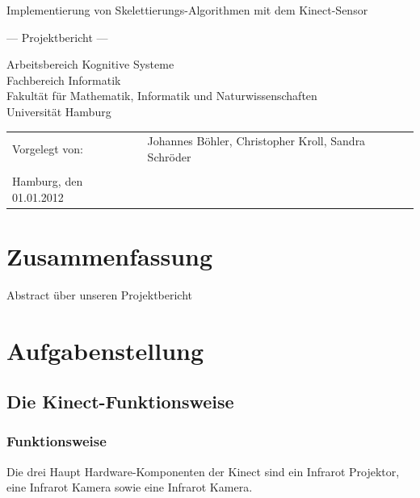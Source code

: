 \documentclass[
	12pt,
	a4paper,
	BCOR10mm,
	DIV14,
	listof=totoc,
	bibliography=totoc,
	headsepline
]{scrreprt}
\begin{document}
\begin{titlepage}
	\begin{center}
		{\titlefont\huge Implementierung von Skelettierungs-Algorithmen mit dem Kinect-Sensor\par}

		\bigskip
		\bigskip

		{\titlefont\Large --- Projektbericht ---\par}

		\bigskip
		\bigskip

		{\large Arbeitsbereich Kognitive Systeme\\
		Fachbereich Informatik\\
		Fakultät für Mathematik, Informatik und Naturwissenschaften\\
		Universität Hamburg\par}
	\end{center}
	
	\vfill
	
	{\large \begin{tabular}{ll}
		Vorgelegt von: & Johannes Böhler, Christopher Kroll, Sandra Schröder \\\\
		Hamburg, den 01.01.2012
	  \end{tabular}\par}

\end{titlepage}

\newcommand{\Autor}[1]{{\hfill \Large \textit{Autor: #1}}}

\chapter*{Zusammenfassung}

\thispagestyle{empty}

Abstract über unseren Projektbericht

\tableofcontents
\chapter{Aufgabenstellung}
\section{Die Kinect-Funktionsweise}
\subsection{Funktionsweise}
Die drei Haupt Hardware-Komponenten der Kinect sind ein Infrarot Projektor, eine Infrarot Kamera sowie eine Infrarot Kamera.
\end{document}
